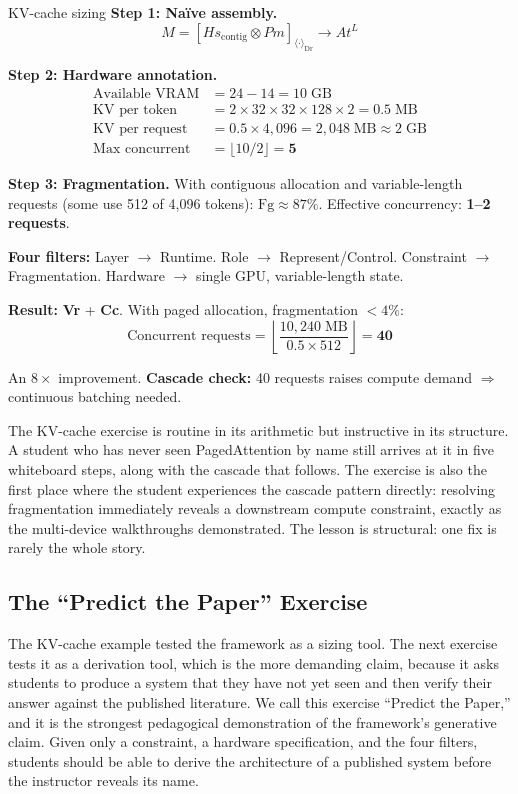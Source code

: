 \documentclass[10pt,twocolumn]{article}
\begin{document}
\begin{napkinmath}{KV-cache sizing}
\textbf{Step 1: Na\"ive assembly.}
\[
M = [Hs_{\text{contig}} \otimes Pm]_{\langle \cdot \rangle_{\text{Dr}}} \rightarrow At^L
\]

\textbf{Step 2: Hardware annotation.}
\begin{align*}
\text{Available VRAM} &= 24 - 14 = 10\;\text{GB} \\
\text{KV per token} &= 2 \times 32 \times 32 \times 128 \times 2 = 0.5\;\text{MB} \\
\text{KV per request} &= 0.5 \times 4{,}096 = 2{,}048\;\text{MB} \approx 2\;\text{GB} \\
\text{Max concurrent} &= \lfloor 10 / 2 \rfloor = \mathbf{5}
\end{align*}

\textbf{Step 3: Fragmentation.} With contiguous allocation and variable-length requests (some use 512 of 4,096 tokens): $\text{Fg} \approx 87\%$. Effective concurrency: \textbf{1--2 requests}.

\textbf{Four filters:} Layer $\to$ Runtime. Role $\to$ Represent/Control. Constraint $\to$ Fragmentation. Hardware $\to$ single GPU, variable-length state.

\textbf{Result:} \textbf{Vr} + \textbf{Cc}. With paged allocation, fragmentation $<4\%$:
\[
\text{Concurrent requests} = \left\lfloor \frac{10{,}240\;\text{MB}}{0.5 \times 512} \right\rfloor = \mathbf{40}
\]

An $8\times$ improvement. \textbf{Cascade check:} 40 requests raises compute demand $\Rightarrow$ continuous batching needed.
\end{napkinmath}

The KV-cache exercise is routine in its arithmetic but instructive in its structure. A student who has never seen PagedAttention by name still arrives at it in five whiteboard steps, along with the cascade that follows. The exercise is also the first place where the student experiences the cascade pattern directly: resolving fragmentation immediately reveals a downstream compute constraint, exactly as the multi-device walkthroughs demonstrated. The lesson is structural: one fix is rarely the whole story.

\subsection{The ``Predict the Paper'' Exercise}
\label{sec:predict-paper}

The KV-cache example tested the framework as a sizing tool. The next exercise tests it as a derivation tool, which is the more demanding claim, because it asks students to produce a system that they have not yet seen and then verify their answer against the published literature. We call this exercise ``Predict the Paper,'' and it is the strongest pedagogical demonstration of the framework's generative claim. Given only a constraint, a hardware specification, and the four filters, students should be able to derive the architecture of a published system before the instructor reveals its name.
\end{document}
